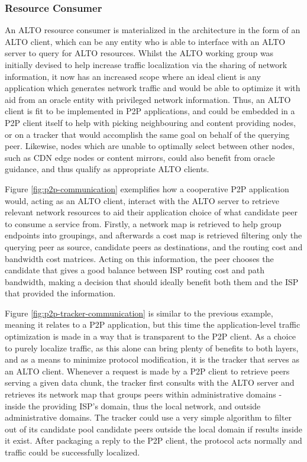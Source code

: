 \subsubsection{Resource Consumer}

    An ALTO resource consumer is materialized in the architecture in the form of an ALTO client, which can be any entity who is able to interface with an ALTO server to query for ALTO resources.
    Whilst the ALTO working group was initially devised to help increase traffic localization via the sharing of network information, it now has an increased scope where an ideal client is any application which generates network traffic and would be able to optimize it with aid from an oracle entity with privileged network information.
    Thus, an ALTO client is fit to be implemented in P2P applications, and could be embedded in a P2P client itself to help with picking neighbouring and content providing nodes, or on a tracker that would accomplish the same goal on behalf of the querying peer.
    Likewise, nodes which are unable to optimally select between other nodes, such as CDN edge nodes or content mirrors, could also benefit from oracle guidance, and thus qualify as appropriate ALTO clients.

    Figure \ref{fig:p2p-communication} exemplifies how a cooperative P2P application would, acting as an ALTO client, interact with the ALTO server to retrieve relevant network resources to aid their application choice of what candidate peer to consume a service from.
    Firstly, a network map is retrieved to help group endpoints into groupings, and afterwards a cost map is retrieved filtering only the querying peer as source, candidate peers as destinations, and the routing cost and bandwidth cost matrices.
    Acting on this information, the peer chooses the candidate that gives a good balance between ISP routing cost and path bandwidth, making a decision that should ideally benefit both them and the ISP that provided the information.

    Figure \ref{fig:p2p-tracker-communication} is similar to the previous example, meaning it relates to a P2P application, but this time the application-level traffic optimization is made in a way that is transparent to the P2P client.
    As a choice to purely localize traffic, as this alone can bring plenty of benefits to both layers, and as a means to minimize protocol modification, it is the tracker that serves as an ALTO client.
    Whenever a request is made by a P2P client to retrieve peers serving a given data chunk, the tracker first consults with the ALTO server and retrieves its network map that groups peers within administrative domains - inside the providing ISP's domain, thus the local network, and outside administrative domains.
    The tracker could use a very simple algorithm to filter out of its candidate pool candidate peers outside the local domain if results inside it exist.
    After packaging a reply to the P2P client, the protocol acts normally and traffic could be successfully localized.

